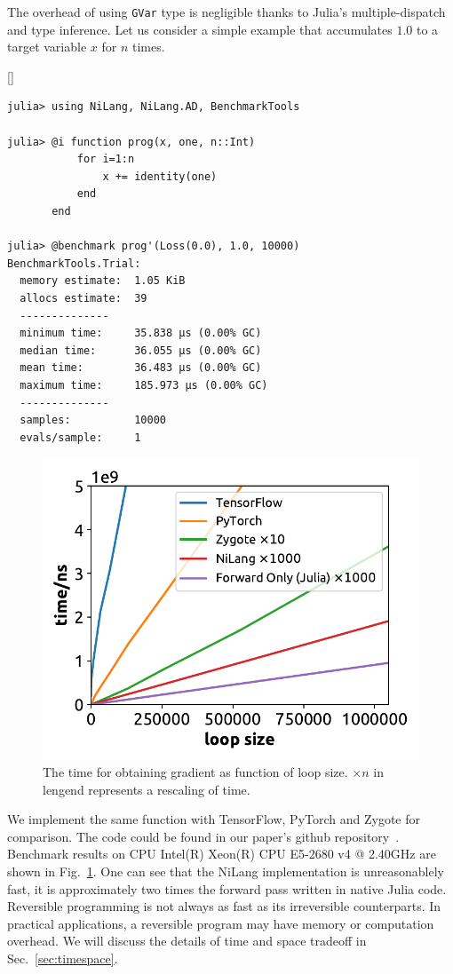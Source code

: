 \documentclass[aps,twocolumn,longbibliography,english,superscriptaddress]{revtex4-1}
\newcommand{\<}{\langle}
\renewcommand{\>}{\rangle}
\newcommand{\Fig}[1]{Fig.~\ref{#1}}
\newcommand{\Sec}[1]{Sec.~\ref{#1}}
\newcommand{\blue}[1]{[{\bf  \color{blue}{JG: #1}}]}
\theoremstyle{definition}\newtheorem{definition}{\textit{Definition}}
\begin{document}
The overhead of using \texttt{GVar} type is negligible thanks to Julia's multiple-dispatch and type inference. Let us consider a simple example that accumulates $1.0$ to a target variable $x$ for $n$ times.

\blue{Grammarly here!}

\begin{minipage}{.44\textwidth}
\begin{lstlisting}
julia> using NiLang, NiLang.AD, BenchmarkTools

julia> @i function prog(x, one, n::Int)
           for i=1:n
               x += identity(one)
           end
       end

julia> @benchmark prog'(Loss(0.0), 1.0, 10000)
BenchmarkTools.Trial: 
  memory estimate:  1.05 KiB
  allocs estimate:  39
  --------------
  minimum time:     35.838 μs (0.00% GC)
  median time:      36.055 μs (0.00% GC)
  mean time:        36.483 μs (0.00% GC)
  maximum time:     185.973 μs (0.00% GC)
  --------------
  samples:          10000
  evals/sample:     1
\end{lstlisting}
\end{minipage}

\begin{figure}
    \centerline{\includegraphics[width=0.9\columnwidth,trim={0 0cm 0 0},clip]{images/fig3.pdf}}
    \caption{The time for obtaining gradient as function of loop size. $\times n$ in lengend represents a rescaling of time.}\label{fig:benchmark}
\end{figure}
We implement the same function with TensorFlow, PyTorch and Zygote for comparison. The code could be found in our paper's github repository~\cite{benchmark}. Benchmark results on CPU Intel(R) Xeon(R) CPU E5-2680 v4 @ 2.40GHz are shown in \Fig{fig:benchmark}.
One can see that the NiLang implementation is unreasonablely fast, it is approximately two times the forward pass written in native Julia code.
Reversible programming is not always as fast as its irreversible counterparts. In practical applications, a reversible program may have memory or computation overhead. We will discuss the details of time and space tradeoff in \Sec{sec:timespace}.
\end{document}
